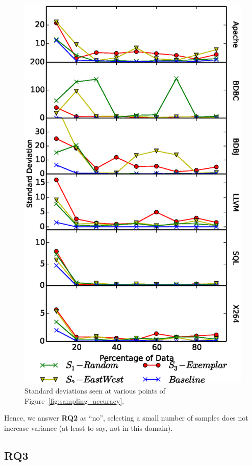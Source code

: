 \documentclass{sig-alternative}
\newcommand{\fig}[1]{Figure~\ref{fig:#1}}
\begin{document}
\begin{figure}[!t]
\includegraphics[width=0.9\linewidth]{Figures/Variance.eps}
\caption{Standard deviations seen at various points of  \fig{sampling_accuracy}.}\label{fig:Variance}
\end{figure}

\begin{myshadowbox}
Hence, we answer {\bf RQ2} as ``no'', selecting a small number of samples does not increase variance (at least to say, not in this domain).
\end{myshadowbox}


\subsection{RQ3}
\end{document}
